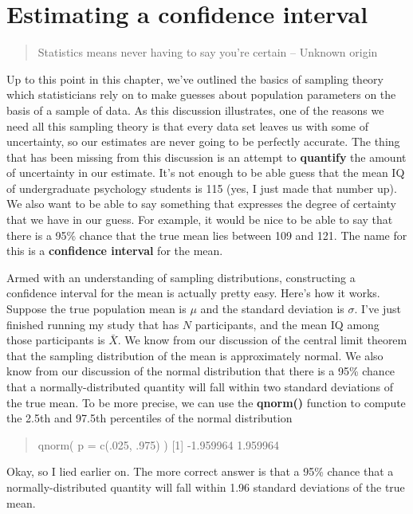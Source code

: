 \documentclass[
  letterpaper,
  DIV=11,
  numbers=noendperiod]{scrreprt}
\begin{document}
\section{Estimating a confidence
interval}\label{estimating-a-confidence-interval}

\begin{quote}
Statistics means never having to say you're certain -- Unknown origin
\end{quote}

Up to this point in this chapter, we've outlined the basics of sampling
theory which statisticians rely on to make guesses about population
parameters on the basis of a sample of data. As this discussion
illustrates, one of the reasons we need all this sampling theory is that
every data set leaves us with some of uncertainty, so our estimates are
never going to be perfectly accurate. The thing that has been missing
from this discussion is an attempt to \textbf{quantify} the amount of
uncertainty in our estimate. It's not enough to be able guess that the
mean IQ of undergraduate psychology students is 115 (yes, I just made
that number up). We also want to be able to say something that expresses
the degree of certainty that we have in our guess. For example, it would
be nice to be able to say that there is a 95\% chance that the true mean
lies between 109 and 121. The name for this is a \textbf{confidence
interval} for the mean.

Armed with an understanding of sampling distributions, constructing a
confidence interval for the mean is actually pretty easy. Here's how it
works. Suppose the true population mean is \(\mu\) and the standard
deviation is \(\sigma\). I've just finished running my study that has
\(N\) participants, and the mean IQ among those participants is
\(\bar{X}\). We know from our discussion of the central limit theorem
that the sampling distribution of the mean is approximately normal. We
also know from our discussion of the normal distribution that there is a
95\% chance that a normally-distributed quantity will fall within two
standard deviations of the true mean. To be more precise, we can use the
\textbf{qnorm()} function to compute the 2.5th and 97.5th percentiles of
the normal distribution

\begin{quote}
qnorm( p = c(.025, .975) ) {[}1{]} -1.959964 1.959964
\end{quote}

Okay, so I lied earlier on. The more correct answer is that a 95\%
chance that a normally-distributed quantity will fall within 1.96
standard deviations of the true mean.
\end{document}
